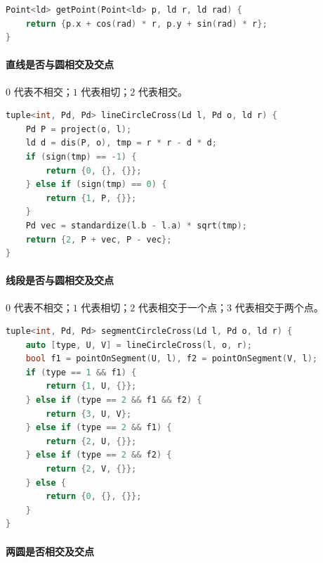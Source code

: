 \begin{lstlisting}[language={C++}]
Point<ld> getPoint(Point<ld> p, ld r, ld rad) {
    return {p.x + cos(rad) * r, p.y + sin(rad) * r};
}
\end{lstlisting}

\hypertarget{ux76f4ux7ebfux662fux5426ux4e0eux5706ux76f8ux4ea4ux53caux4ea4ux70b9}{%
\paragraph{直线是否与圆相交及交点}\label{ux76f4ux7ebfux662fux5426ux4e0eux5706ux76f8ux4ea4ux53caux4ea4ux70b9}}

\(0\) 代表不相交；\(1\) 代表相切；\(2\) 代表相交。

\begin{lstlisting}[language={C++}]
tuple<int, Pd, Pd> lineCircleCross(Ld l, Pd o, ld r) {
    Pd P = project(o, l);
    ld d = dis(P, o), tmp = r * r - d * d;
    if (sign(tmp) == -1) {
        return {0, {}, {}};
    } else if (sign(tmp) == 0) {
        return {1, P, {}};
    }
    Pd vec = standardize(l.b - l.a) * sqrt(tmp);
    return {2, P + vec, P - vec};
}
\end{lstlisting}

\hypertarget{ux7ebfux6bb5ux662fux5426ux4e0eux5706ux76f8ux4ea4ux53caux4ea4ux70b9}{%
\paragraph{线段是否与圆相交及交点}\label{ux7ebfux6bb5ux662fux5426ux4e0eux5706ux76f8ux4ea4ux53caux4ea4ux70b9}}

\(0\) 代表不相交；\(1\) 代表相切；\(2\) 代表相交于一个点；\(3\) 代表相交于两个点。

\begin{lstlisting}[language={C++}]
tuple<int, Pd, Pd> segmentCircleCross(Ld l, Pd o, ld r) {
    auto [type, U, V] = lineCircleCross(l, o, r);
    bool f1 = pointOnSegment(U, l), f2 = pointOnSegment(V, l);
    if (type == 1 && f1) {
        return {1, U, {}};
    } else if (type == 2 && f1 && f2) {
        return {3, U, V};
    } else if (type == 2 && f1) {
        return {2, U, {}};
    } else if (type == 2 && f2) {
        return {2, V, {}};
    } else {
        return {0, {}, {}};
    }
}
\end{lstlisting}

\hypertarget{ux4e24ux5706ux662fux5426ux76f8ux4ea4ux53caux4ea4ux70b9}{%
\paragraph{两圆是否相交及交点}\label{ux4e24ux5706ux662fux5426ux76f8ux4ea4ux53caux4ea4ux70b9}}

